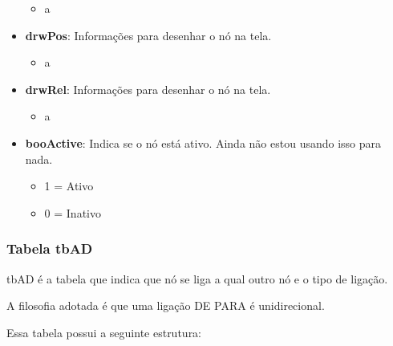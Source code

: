 \begin{itemize}
			\begin{itemize}
				\item a
			\end{itemize}
	\item \textbf{drwPos}: Informações para desenhar o nó na tela.
			\begin{itemize}
				\item a
			\end{itemize}
	\item \textbf{drwRel}: Informações para desenhar o nó na tela.
			\begin{itemize}
				\item a
			\end{itemize}
	\item \textbf{booActive}: Indica se o nó está ativo. Ainda não estou usando isso para nada.
			\begin{itemize}
				\item 1 = Ativo
				\item 0 = Inativo
			\end{itemize}
	
\end{itemize}


\subsubsection{Tabela tbAD}

tbAD é a tabela que indica que nó se liga a qual outro nó e o tipo de ligação.

A filosofia adotada é que uma ligação DE PARA é unidirecional.

Essa tabela possui a seguinte estrutura:

